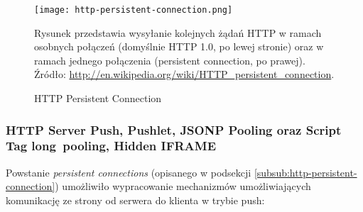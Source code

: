\begin{figure}[H]
  \centering
    \texttt{[image: http-persistent-connection.png]}
  \caption[HTTP Persistent Connection]{HTTP Persistent Connection}
    Rysunek przedstawia wysyłanie kolejnych żądań HTTP w ramach osobnych połączeń (domyślnie HTTP 1.0, po lewej stronie) oraz w ramach jednego połączenia (persistent connection, po prawej). Źródło: \url{http://en.wikipedia.org/wiki/HTTP_persistent_connection}.
\end{figure}

\subsubsection{HTTP Server Push, Pushlet, JSONP Pooling oraz Script Tag \mbox{long pooling}, Hidden IFRAME}

Powstanie \emph{persistent connections} (opisanego w podsekcji \ref{subsub:http-persistent-connection}) umożliwiło wypracowanie mechanizmów umożliwiających komunikację ze strony od serwera do klienta w trybie push:

